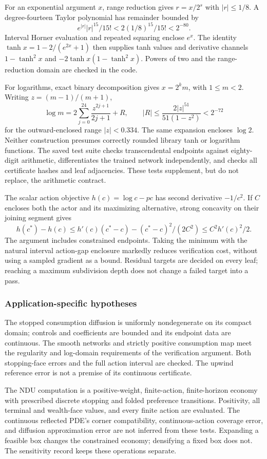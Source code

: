 For an exponential argument $x$, range reduction gives $r=x/2^s$ with $|r|\leq1/8$. A degree-fourteen Taylor polynomial has remainder bounded by
\[
 e^{|r|}|r|^{15}/15!<2(1/8)^{15}/15!<2^{-80}.
\]
Interval Horner evaluation and repeated squaring enclose $e^x$. The identity $\tanh x=1-2/(e^{2x}+1)$ then supplies tanh values and derivative channels $1-\tanh^2x$ and $-2\tanh x(1-\tanh^2x)$. Powers of two and the range-reduction domain are checked in the code.

For logarithms, exact binary decomposition gives $x=2^km$, with $1\leq m<2$. Writing $z=(m-1)/(m+1)$,
\[
 \log m=2\sum_{j=0}^{24}\frac{z^{2j+1}}{2j+1}+R,
 \qquad |R|\leq\frac{2|z|^{51}}{51(1-z^2)}<2^{-72}
\]
for the outward-enclosed range $|z|<0.334$. The same expansion encloses $\log2$. Neither construction presumes correctly rounded library tanh or logarithm functions. The saved test suite checks transcendental endpoints against eighty-digit arithmetic, differentiates the trained network independently, and checks all certificate hashes and leaf adjacencies. These tests supplement, but do not replace, the arithmetic contract.

The scalar action objective $h(c)=\log c-pc$ has second derivative $-1/c^2$. If $C$ encloses both the actor and its maximizing alternative, strong concavity on their joining segment gives
\[
 h(c^*)-h(c)\leq h'(c)(c^*-c)-(c^*-c)^2/(2C^2)
 \leq C^2h'(c)^2/2.
\]
The argument includes constrained endpoints. Taking the minimum with the natural interval action-gap enclosure markedly reduces verification cost, without using a sampled gradient as a bound. Residual targets are decided on every leaf; reaching a maximum subdivision depth does not change a failed target into a pass.

\subsubsection{Application-specific hypotheses}
The stopped consumption diffusion is uniformly nondegenerate on its compact domain; controls and coefficients are bounded and its endpoint data are continuous. The smooth networks and strictly positive consumption map meet the regularity and log-domain requirements of the verification argument. Both stopping-face errors and the full action interval are checked. The upwind reference error is not a premise of its continuous certificate.

The NDU computation is a positive-weight, finite-action, finite-horizon economy with prescribed discrete stopping and folded preference transitions. Positivity, all terminal and wealth-face values, and every finite action are evaluated. The continuous reflected PDE's corner compatibility, continuous-action coverage error, and diffusion approximation error are not inferred from these tests. Expanding a feasible box changes the constrained economy; densifying a fixed box does not. The sensitivity record keeps these operations separate.

